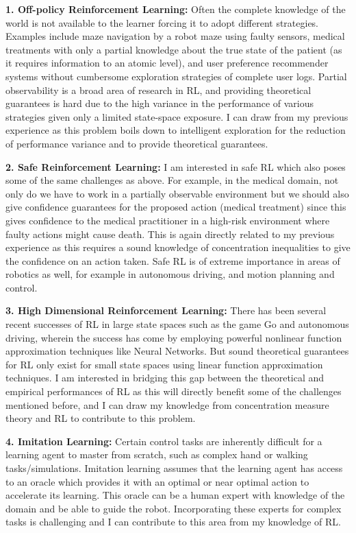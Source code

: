 \documentclass{article}
\begin{document}
\textbf{1. Off-policy Reinforcement Learning:} Often the complete knowledge of the world is not available to the learner forcing it to adopt different strategies. Examples include maze navigation by a robot maze using faulty sensors, medical treatments with only a partial knowledge about the true state of the patient (as it requires information to
an atomic level), and user preference recommender systems without cumbersome exploration strategies of complete user logs. Partial observability is a broad area of research in RL, and providing theoretical guarantees is hard due to the high variance in the performance of various strategies given only a limited state-space exposure. I can draw from my previous experience as this problem boils down to intelligent exploration for the reduction of performance variance and to provide theoretical guarantees.


\textbf{2. Safe Reinforcement Learning:} I am interested in safe RL which also poses some of the same challenges as above. For example, in the medical domain, not only do we have to work in a partially observable environment but we should also give confidence guarantees for the proposed action (medical treatment) since this gives confidence to the medical
practitioner in a high-risk environment where faulty actions might cause death. This is again directly related to my previous experience as this requires a sound knowledge of concentration inequalities to give the confidence on an action taken. Safe RL is of extreme importance in areas of robotics as well, for example in autonomous driving,
and motion planning and control.


\textbf{3. High Dimensional Reinforcement Learning:} There has been several recent successes of RL in large state spaces such as the game Go and autonomous driving, wherein the success has come by employing powerful nonlinear function approximation techniques like Neural Networks. But sound theoretical guarantees for RL only exist
for small state spaces using linear function approximation techniques. I am interested in bridging this gap between the theoretical and empirical performances of RL as this will directly benefit some of the challenges mentioned before, and I can draw my knowledge from concentration measure theory and RL to contribute to this problem.

\textbf{4. Imitation Learning:} Certain control tasks are inherently difficult for a learning agent to master from scratch, such as complex hand or walking tasks/simulations. Imitation learning assumes that the learning agent has access to an oracle which provides it with an optimal or near optimal action to accelerate its learning. This oracle can  be a human expert with knowledge of the domain and be able to guide the robot. Incorporating these experts for complex tasks is challenging and I can contribute to this area from my knowledge of RL.
\end{document}
